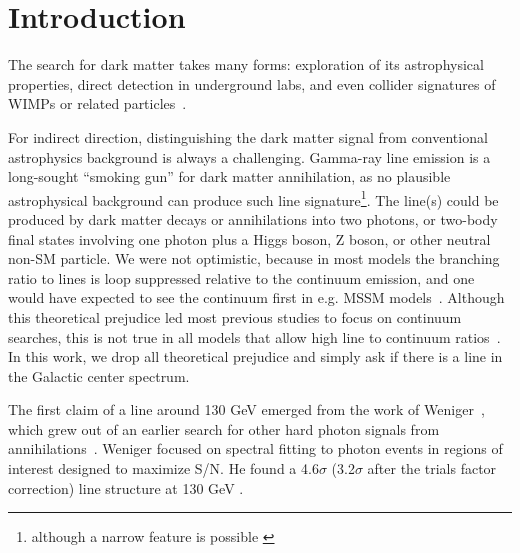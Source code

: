 \documentclass[aps,twocolumn,prd,superscriptaddress,showpacs,nofootinbib,fixfloat]{revtex4}
\begin{document}
\maketitle




\section{Introduction}

The search for dark matter takes many forms: exploration of
its astrophysical properties, direct detection in
underground labs, and even collider signatures of WIMPs or
related
particles~\citep{Jungman:1995df,Bergstrom:2000,Bertone:2005,
Hooper:2007Review, 2012arXiv1205.4882B}.

For indirect direction, distinguishing the dark matter
signal from conventional astrophysics background is always a
challenging. Gamma-ray line emission is a long-sought
``smoking gun'' for dark matter annihilation, as no
plausible astrophysical background can produce such line
signature\footnote{although a narrow feature is possible
\citep[see][]{2012arXiv1207.0458A}}.  The line(s) could be
produced by dark matter decays or annihilations into two
photons, or two-body final states involving one photon plus
a Higgs boson, Z boson, or other neutral non-SM particle. We
were not optimistic, because in most models the branching
ratio to lines is loop suppressed relative to the continuum
emission, and one would have expected to see the continuum
first in e.g. MSSM models~\citep[e.g.][]{Bergstrom:1997}.
Although this theoretical prejudice led most previous
studies to focus on continuum searches, this is not true in
all models that allow high line to continuum
ratios~\citep[e.g.][]{Bergstrom:1998, Bergstrom:2000,
Bertone:2009, Jackson:2010, Cline:2012, Weiner:2012}.  In
this work, we drop all theoretical prejudice and simply ask
if there is a line in the Galactic center spectrum.

The first claim of a line around 130 GeV emerged from the
work of Weniger~\citep{Weniger:2012}, which grew out of an
earlier search for other hard photon signals from
annihilations~\citep{Bringmann:2012}.  Weniger focused on
spectral fitting to photon events in regions of interest
designed to maximize S/N.  He found a 4.6$\sigma$
(3.2$\sigma$ after the trials factor correction) line
structure at 130 GeV .
\end{document}
